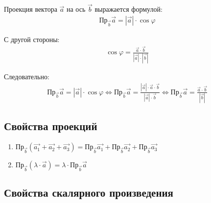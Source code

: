 \documentclass[a4paper,12pt]{extbook}
\theoremstyle{named}
\theoremstyle{named}
\begin{document}
Проекция вектора \(\overrightarrow{a}\) на ось \(\overrightarrow{b}\) выражается формулой:
\begin{gather*}
    \text{Пр}_{\overrightarrow{b}}\overrightarrow{a} = |\overrightarrow{a}| \cdot \cos{\varphi}
\end{gather*}

С другой стороны:
\begin{gather*}
    \cos{\varphi} = \frac{\overrightarrow{a} \cdot \overrightarrow{b}}{|\overrightarrow{a}| \cdot |\overrightarrow{b}|}
\end{gather*}

Следовательно:
\begin{gather*}
    \text{Пр}_{\overrightarrow{b}}\overrightarrow{a} = |\overrightarrow{a}| \cdot \cos{\varphi} \iff
    \text{Пр}_{\overrightarrow{b}}\overrightarrow{a} = \frac{|\overrightarrow{a}| \cdot \overrightarrow{a} \cdot \overrightarrow{b}}{|\overrightarrow{a}| \cdot \overrightarrow{b}} \iff
    \text{Пр}_{\overrightarrow{b}}\overrightarrow{a} =
    \frac{\overrightarrow{a} \cdot \overrightarrow{b}}{|\overrightarrow{b}|}
\end{gather*}

\subsection*{Свойства проекций}
\begin{enumerate}
    \item {
          \(    \text{Пр}_{\overrightarrow{b}}(\overrightarrow{a_1} + \overrightarrow{a_2} + \overrightarrow{a_3}) =
          \text{Пр}_{\overrightarrow{b}}\overrightarrow{a_1} +
          \text{Пр}_{\overrightarrow{b}}\overrightarrow{a_2} +
          \text{Пр}_{\overrightarrow{b}}\overrightarrow{a_3}
          \)
          }
    \item {
          \(
          \text{Пр}_{\overrightarrow{b}}(\lambda \cdot \overrightarrow{a}) = \lambda \cdot \text{Пр}_{\overrightarrow{b}}\overrightarrow{a}
          \)
          }
\end{enumerate}

\subsection*{Свойства скалярного произведения}
\end{document}
